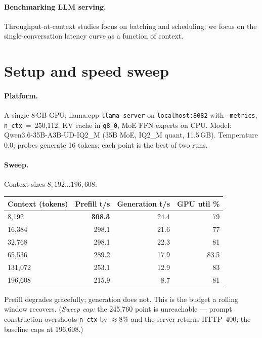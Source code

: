 \documentclass{article}
\begin{document}
\paragraph{Benchmarking LLM serving.}
Throughput-at-context studies \citep{bao2024rlbench} focus on batching and
scheduling; we focus on the single-conversation latency curve as a function of context.

\section{Setup and speed sweep}
\label{sec:sweep}

\paragraph{Platform.} A single 8\,GB GPU; llama.cpp \texttt{llama-server} on
\texttt{localhost:8082} with \texttt{--metrics}, \texttt{n\_ctx}~=~250{,}112, KV cache
in \texttt{q8\_0}, MoE FFN experts on CPU. Model: Qwen3.6-35B-A3B-UD-IQ2\_M (35B MoE,
IQ2\_M quant, 11.5\,GB). Temperature 0.0; probes generate 16 tokens; each point is the
best of two runs.

\paragraph{Sweep.} Context sizes $8{,}192 \ldots 196{,}608$:

\begin{center}
\begin{tabular}{@{}lrrr@{}}
\toprule
Context (tokens) & Prefill t/s & Generation t/s & GPU util \% \\
\midrule
8{,}192    & \textbf{308.3} & 24.4 & 79 \\
16{,}384   & 298.1 & 21.6 & 77 \\
32{,}768   & 298.1 & 22.3 & 81 \\
65{,}536   & 289.2 & 17.9 & 83.5 \\
131{,}072  & 253.1 & 12.9 & 83 \\
196{,}608  & 215.9 & 8.7 & 81 \\
\bottomrule
\end{tabular}
\end{center}

Prefill degrades gracefully; generation does not. This is the budget a rolling window
recovers. (\emph{Sweep cap:} the 245{,}760 point is unreachable --- prompt construction
overshoots \texttt{n\_ctx} by $\approx 8\%$ and the server returns HTTP~400; the
baseline caps at 196{,}608.)
\end{document}
